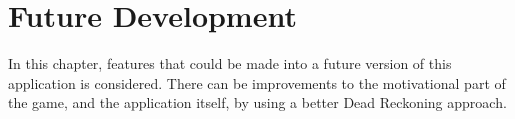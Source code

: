 \chapter{Future Development}
In this chapter, features that could be made into a future version of this application is considered.
There can be improvements to the motivational part of the game, and the application itself, by using a better Dead Reckoning approach.